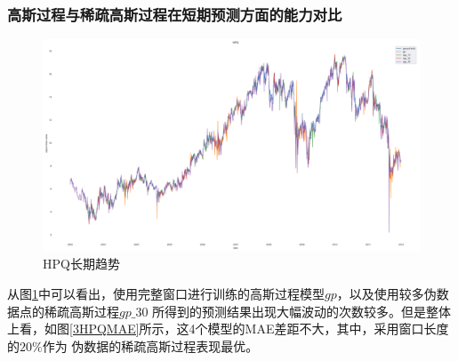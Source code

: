 \subsubsection{高斯过程与稀疏高斯过程在短期预测方面的能力对比}


\begin{figure}[!htbp]
    \centering
    \includegraphics[width=\textwidth]{images/lab3/HPQ_trend.png}
    \caption{HPQ长期趋势}\label{3lab3HPQtrend}
\end{figure}


从图\ref{3lab3HPQtrend}中可以看出，使用完整窗口进行训练的高斯过程模型$gp$，以及使用较多伪数据点的稀疏高斯过程$gp\_30$
所得到的预测结果出现大幅波动的次数较多。但是整体上看，如图\ref{3HPQMAE}所示，这4个模型的MAE差距不大，其中，采用窗口长度的$20\%$作为
伪数据的稀疏高斯过程表现最优。

